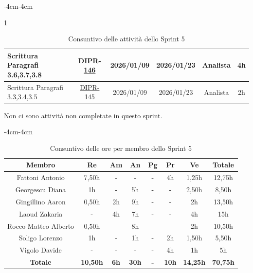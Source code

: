 \documentclass[a4paper,12pt]{article}
\begin{document}
\begin{table}[H]
\begin{adjustwidth}{-4cm}{-4cm}
\begin{spacing}{1}
\begin{tabular}{|p{4cm}|c|c|c|c|c|}
        \hline
        Scrittura Paragrafi 3.6,3.7,3.8& \href{https://7zpus.atlassian.net/browse/DIPR-146}{DIPR-146} & 2026/01/09 & 2026/01/23 & Analista & 4h \\
        \hline
        Scrittura Paragrafi 3.3,3.4,3.5 & \href{https://7zpus.atlassian.net/browse/DIPR-145}{DIPR-145} & 2026/01/09 & 2026/01/23 & Analista & \textcolor{green!50!black}{2h}\\
        \hline
        \end{tabular}
    \end{spacing}
    \caption{Consuntivo delle attività dello Sprint 5}
    \end{adjustwidth}
\end{table}

Non ci sono attività non completate in questo sprint.

\begin{table}[H]
    \begin{adjustwidth}{-4cm}{-4cm}
    \centering
    \begin{tabular}{|c|c|c|c|c|c|c|c|}
        \hline
        \textbf{Membro} & \textbf{Re} & \textbf{Am}  & \textbf{An} & \textbf{Pg} & \textbf{Pr} & \textbf{Ve} & \textbf{Totale} \\
        \hline
        Fattoni Antonio & 7,50h & - & - & - & 4h & 1,25h & 12,75h \\
        \hline
        Georgescu Diana & 1h & - & 5h & - & - & 2,50h & 8,50h \\
        \hline
        Gingillino Aaron & 0,50h & 2h & 9h & - & - & 2h & 13,50h \\
        \hline
        Laoud Zakaria & - & 4h & 7h & - & - & 4h & 15h \\
        \hline
        Rocco Matteo Alberto & 0,50h & - & 8h & - & - & 2h & 10,50h \\
        \hline
        Soligo Lorenzo & 1h & - & 1h & - & 2h & 1,50h & 5,50h \\
        \hline
        Vigolo Davide & - & - & - & - & 4h & 1h & 5h \\
        \hline
        \textbf{Totale} & \textbf{10,50h} & \textbf{6h} & \textbf{30h} & \textbf{-} & \textbf{10h} & \textbf{14,25h} & \textbf{70,75h} \\
        \hline
    \end{tabular}
    \caption{Consuntivo delle ore per membro dello Sprint 5}
    \end{adjustwidth}
\end{table}
\end{document}
